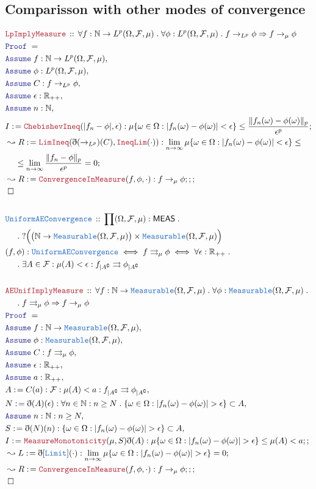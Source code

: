 \documentclass[12pt]{scrartcl}
\newcommand{\TYPE}[1]{\textcolor{NavyBlue}{\mathtt{#1}}}
\newcommand{\LOGIC}[1]{\textcolor{Blue}{\mathtt{#1}}}
\newcommand{\THM}[1]{\textcolor{Maroon}{\mathtt{#1}}}
\renewcommand{\.}{\; . \;}
\newcommand{\de}{: \kern 0.1pc =}
\newcommand{\Theorem}[2]{& \THM{#1} \, :: \, #2 \\ & \Proof = \\ }
\newcommand{\DeclareType}[2]{& \TYPE{#1} \, :: \, #2 \\}
\newcommand{\DefineNamedType}[4]{& #1 : \TYPE{#2} \iff #3 \iff #4 \\}
\newcommand{\NewLine}{\\ & \kern 1pc}
\newcommand{\ForEach}[3]{\forall #1 : #2 \. #3 }
\newcommand{\Exist}[2]{\exists #1 : #2}
\newcommand{\DFunc}[3]{\prod #1 : #2 \. #3 }
\newcommand{\Reals}{\mathbb{R} }
\newcommand{\Nat}{\mathbb{N} }
\newcommand{\Say}[3]{& #1 \de #2 : #3, \\}
\newcommand{\Conclude}[3]{& #1 \de #2 : #3; \\}
\newcommand{\DeriveConclude}[3]{& \leadsto #1 \de #2 : #3 ; \\}
\newcommand{\A}{\LOGIC{Assume} \;}
\newcommand{\Assume}[2]{& \A #1 : #2, \\}
\newcommand{\QED}{\; \square}
\newcommand{\EndProof}{& \QED \\}
\newcommand{\ByDef}{\eth}
\newcommand{\Proof}{\LOGIC{Proof} \; }
\newcommand{\UC}{\rightrightarrows}
\newcommand{\F}{\mathcal{F}}
\renewcommand{\O}{\Omega}
\begin{document}
\subsection{Comparisson with other modes of convergence}
\begin{align*}
\Theorem{LpImplyMeasure}{
\ForEach{f}{\Nat \to L^p(\O,\F,\mu)}{
\ForEach{\phi}{L^p(\O,\F,\mu)}{
 f \to_{L^p} \phi \Rightarrow f \to_\mu \phi 
}}}
\Assume{f}{\Nat \to L^p(\O,\F,\mu)}
\Assume{\phi}{ L^p(\O,\F,\mu)}
\Assume{C}{f \to_{L^p} \phi }
\Assume{\epsilon}{\Reals_{++}}
\Assume{n}{\Nat}
\Conclude{I}{\THM{ChebishevIneq}(|f_n - \phi|,\epsilon)}
{\mu\{ \omega \in \O : |f_n(\omega) - \phi(\omega)| < \epsilon \} \le \frac{\| f_n(\omega) - \phi(\omega) \|_p}{\epsilon^p}}
\DeriveConclude{R}{\THM{LimIneq}(\ByDef(\to_{L^p})(C),\THM{IneqLim}(\cdot))}
{ \lim_{n \to \infty} \mu\{ \omega \in \O : |f_n(\omega) - \phi(\omega)| < \epsilon \} \le 
 \NewLine \le 
 \lim_{n \to \infty} \frac{\| f_n - \phi \|_p}{\epsilon^p} = 0  }
\DeriveConclude{R}{\THM{ConvergenceInMeasure}(f,\phi,\cdot)}{f \to_\mu \phi ;;}
\EndProof
\\
\DeclareType{UniformAEConvergence}{\DFunc{(\O,\F,\mu)}{\mathsf{MEAS}}{
\NewLine \.
? \Big( \big( \Nat \to \TYPE{Measurable}(\O,\F,\mu) \big) \times \TYPE{Measurable}(\O,\F,\mu) \Big)}} 
\DefineNamedType{(f,\phi)}{UniformAEConvergence}{f \UC_\mu  \phi}{
\ForEach{\epsilon}{\Reals_{++}}{
\NewLine \.
\Exist{A \in \F}{\mu(A) < \epsilon : f_{|A^\complement} \UC \phi_{|A^\complement}}}}
\\
\Theorem{AEUnifImplyMeasure}{
\ForEach{f}{\Nat \to \TYPE{Measurable}(\O,\F,\mu)}{
\ForEach{\phi}{\TYPE{Measurable}(\O,\F,\mu)}{
 \NewLine \. 
 f \UC_\mu \phi \Rightarrow f \to_\mu \phi 
}}}
\Assume{f}{\Nat \to \TYPE{Measurable}(\O,\F,\mu)}
\Assume{\phi}{\TYPE{Measurable}(\O,\F,\mu)}
\Assume{C}{f \UC_\mu \phi}
\Assume{\epsilon}{\Reals_{++}}
\Assume{a}{\Reals_{++}}
\Say{A}{C(a)}{\F : \mu(A) < a  : f_{|A^\complement} \UC \phi_{|A^\complement}}
\Say{N}{\ByDef(A)(\epsilon)}{\forall n \in \Nat : n \ge N \. \{ \omega \in \O : |f_n(\omega) - \phi(\omega)| > \epsilon \} \subset A }
\Assume{n}{\Nat : n \ge N  }
\Say{S}{\ByDef(N)(n)}{\{ \omega \in \O : |f_n(\omega) - \phi(\omega)| > \epsilon \} \subset A}
\Conclude{I}{\THM{MeasureMonotonicity}(\mu,S)\ByDef(A)}{
\mu\{ \omega \in \O : |f_n(\omega) - \phi(\omega)| > \epsilon \} \le \mu(A) < a ;}
\DeriveConclude{L}{\ByDef[\TYPE{Limit}](\cdot)} 
{ \lim_{n \to \infty} \mu\{ \omega \in \O : |f_n(\omega) - \phi(\omega)| > \epsilon \} = 0 }
\DeriveConclude{R}{\THM{ConvergenceInMeasure}(f,\phi,\cdot)}{f \to_\mu \phi ;;}
\EndProof
 \end{align*}
\end{document}
